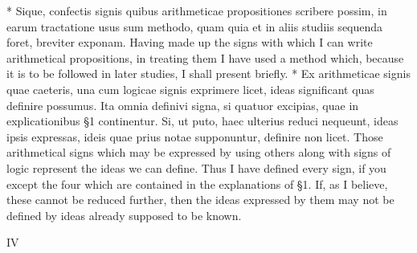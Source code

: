 \documentclass{book}
\newcommand{\s}{\switchcolumn} %
\newcommand{\peanoPage}[1]{\vspace{1ex}

  \columnratio{0.475, 0.05, 0.475} \begin{paracol}{3} \centering \hdashrule{\columnwidth}{0.1mm}{0.1mm 1mm} \s #1 \s \hdashrule{\columnwidth}{0.1mm}{0.1mm 1mm} \end{paracol}

\vspace{1ex}}
\newenvironment{translateTwoCol}
               { %
                 \columnratio{0.5, 0.5} \begin{paracol}{2}
                 \newcommand{\LAT}{\switchcolumn[0]*}
                 \newcommand{\ENG}{\switchcolumn[1]}
               }
               { %
                 \let\ENG\undefined
                 \let\LAT\undefined
                 \end{paracol}
               }
\begin{document}
\begin{translateTwoCol}
\LAT
Sique, confectis signis quibus arithmeticae propositiones scribere possim, in earum tractatione usus sum methodo, quam quia et in aliis studiis sequenda foret, breviter exponam.
\ENG Having made up the signs with which I can write arithmetical propositions, in treating them I have used a method which, because it is to be followed in later studies, I shall present briefly.
\LAT
Ex arithmeticae signis quae caeteris, una cum logicae signis exprimere licet, ideas significant quas definire possumus. Ita omnia definivi signa, si quatuor excipias, quae in explicationibus \S 1 continentur. Si, ut puto, haec ulterius reduci nequeunt, ideas ipsis expressas, ideis quae prius notae supponuntur, definire non licet.
\ENG Those arithmetical signs which may be expressed by using others along with signs of logic represent the ideas we can define. Thus I have defined every sign, if you except the four which are contained in the explanations of \S 1. If, as I believe, these cannot be reduced further, then the ideas expressed by them may not be defined by ideas already supposed to be known.
\end{translateTwoCol}

\peanoPage{IV} %
\end{document}
